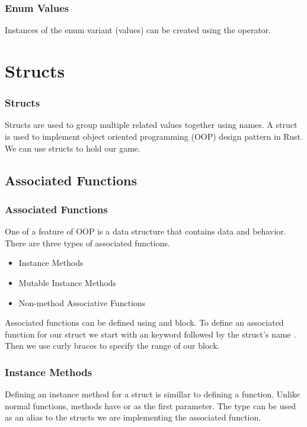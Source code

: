 \documentclass{beamer}
\begin{document}
\begin{frame}[fragile]
  \frametitle{Enum Values}
  Instances of the enum variant (values) can be created using the \inlinecode{::} operator.

  
\end{frame}

\section{Structs}
\begin{frame}
  \frametitle{Structs}
  Structs are used to group multiple related values together using names. A struct is used to implement object oriented programming (OOP) design pattern in Rust. We can use structs to hold our game.
  
\end{frame}

\subsection{Associated Functions}
\begin{frame}
  \frametitle{Associated Functions}
  One of a feature of OOP is a data structure that contains data and behavior. There are three types of associated functions.
  \begin{itemize}
    \item Instance Methods
    \item Mutable Instance Methods
    \item Non-method Associative Functions
  \end{itemize}
  Associated functions can be defined using and  block. To define an associated function for our  struct we start with an  keyword followed by the struct's name . Then we use curly braces to specify the range of our block.
\end{frame}

\begin{frame}
  \frametitle{Instance Methods}
  Defining an instance method for a struct is simillar to defining a function. Unlike normal functions, methods have  or  as the first parameter. The  type can be used as an alias to the structs we are implementing the associated function.
  
\end{frame}
\end{document}
